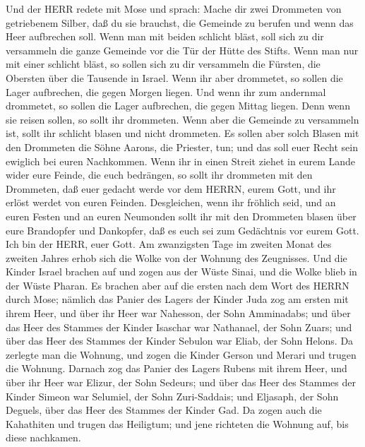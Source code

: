  Und der HERR redete mit Mose und sprach:  Mache
dir zwei Drommeten von getriebenem Silber, daß du sie brauchst, die
Gemeinde zu berufen und wenn das Heer aufbrechen soll.  Wenn
man mit beiden schlicht bläst, soll sich zu dir versammeln die ganze
Gemeinde vor die Tür der Hütte des Stifts.  Wenn man nur mit
einer schlicht bläst, so sollen sich zu dir versammeln die Fürsten, die
Obersten über die Tausende in Israel.  Wenn ihr aber
drommetet, so sollen die Lager aufbrechen, die gegen Morgen liegen.
 Und wenn ihr zum andernmal drommetet, so sollen die Lager
aufbrechen, die gegen Mittag liegen. Denn wenn sie reisen sollen, so
sollt ihr drommeten.  Wenn aber die Gemeinde zu versammeln
ist, sollt ihr schlicht blasen und nicht drommeten.  Es
sollen aber solch Blasen mit den Drommeten die Söhne Aarons, die
Priester, tun; und das soll euer Recht sein ewiglich bei euren
Nachkommen.  Wenn ihr in einen Streit ziehet in eurem Lande
wider eure Feinde, die euch bedrängen, so sollt ihr drommeten mit den
Drommeten, daß euer gedacht werde vor dem HERRN, eurem Gott, und ihr
erlöst werdet von euren Feinden.  Desgleichen, wenn ihr
fröhlich seid, und an euren Festen und an euren Neumonden sollt ihr mit
den Drommeten blasen über eure Brandopfer und Dankopfer, daß es euch sei
zum Gedächtnis vor eurem Gott. Ich bin der HERR, euer Gott.
 Am zwanzigsten Tage im zweiten Monat des zweiten Jahres
erhob sich die Wolke von der Wohnung des Zeugnisses.  Und
die Kinder Israel brachen auf und zogen aus der Wüste Sinai, und die
Wolke blieb in der Wüste Pharan.  Es brachen aber auf die
ersten nach dem Wort des HERRN durch Mose;  nämlich das
Panier des Lagers der Kinder Juda zog am ersten mit ihrem Heer, und über
ihr Heer war Nahesson, der Sohn Amminadabs;  und über das
Heer des Stammes der Kinder Isaschar war Nathanael, der Sohn Zuars;
 und über das Heer des Stammes der Kinder Sebulon war
Eliab, der Sohn Helons.  Da zerlegte man die Wohnung, und
zogen die Kinder Gerson und Merari und trugen die Wohnung. 
Darnach zog das Panier des Lagers Rubens mit ihrem Heer, und über ihr
Heer war Elizur, der Sohn Sedeurs;  und über das Heer des
Stammes der Kinder Simeon war Selumiel, der Sohn Zuri-Saddais;
 und Eljasaph, der Sohn Deguels, über das Heer des Stammes
der Kinder Gad.  Da zogen auch die Kahathiten und trugen
das Heiligtum; und jene richteten die Wohnung auf, bis diese nachkamen.
